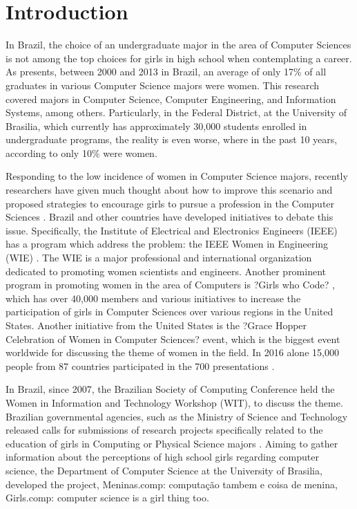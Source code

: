 \section{Introduction}\label{sec:intro}%

In Brazil, the choice of an undergraduate major in the area of Computer Sciences is not among the top choices for girls in high school when contemplating a career. As \cite{maia_2016} presents, between 2000 and 2013 in Brazil, an average of only 17\% of all graduates in various Computer Science majors were women. This research covered majors in Computer Science, Computer Engineering, and Information Systems, among others. Particularly, in the Federal District, at the University of Brasilia, which currently has approximately 30,000 students enrolled in undergraduate programs, the reality is even worse, where in the past 10 years, according to \cite{couto_2014} only 10\% were women.

	Responding to the low incidence of women in Computer Science majors, recently researchers have given much thought about how to improve this scenario and proposed strategies to encourage girls to pursue a profession in the Computer Sciences   \cite{cohoon_2002} \cite{couto_2014}  \cite{gurer_2002}  \cite{maia_2016}. Brazil and other countries have developed initiatives to debate this issue. Specifically, the Institute of Electrical and Electronics Engineers (IEEE) has a program which address the problem: the IEEE Women in Engineering (WIE) \cite{wie2017}. The WIE is a major professional and international organization dedicated to promoting women scientists and engineers. Another prominent program in promoting women in the area of Computers is ?Girls who Code? \cite{girlsWC_2017}, which has over 40,000 members and various initiatives to increase the participation of girls in Computer Sciences over various regions in the United States. Another initiative from the United States is the ?Grace Hopper Celebration of Women in Computer Sciences? event, which is the biggest event worldwide for discussing the theme of women in the field. In 2016 alone 15,000 people from 87 countries participated in the 700 presentations \cite{GHC_2017}.

	In Brazil, since 2007, the Brazilian Society of Computing Conference held the Women in Information and Technology Workshop (WIT), to discuss the theme. Brazilian governmental agencies, such as the Ministry of Science and Technology released calls for submissions of research projects specifically related to the education of girls in Computing or Physical Science majors \cite{cnpq_2017}. Aiming to gather information about the perceptions of high school girls regarding computer science, the Department of Computer Science at the University of Brasilia, developed the project, Meninas.comp: computação  tambem e coisa de menina, Girls.comp: computer science is a girl thing too.


